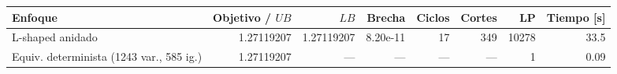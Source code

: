{\small
\begin{tabular}{lrrrrrrr}
\toprule
Enfoque & Objetivo / $UB$ & $LB$ & Brecha & Ciclos & Cortes & LP & Tiempo [s] \\
\midrule
L-shaped anidado & 1.27119207 & 1.27119207 & 8.20e-11 & 17 & 349 & 10278 & 33.5 \\
Equiv. determinista (1243 var., 585 ig.) & 1.27119207 & — & — & — & — & 1 & 0.09 \\
\bottomrule
\end{tabular}
}
